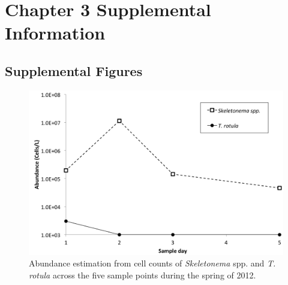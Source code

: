 


\chapter{Chapter 3 Supplemental Information}
\clearpage
\section{Supplemental Figures}

\begin{figure}[h!]
  \centering
    \includegraphics[width=1\textwidth]{Images/C3_SFigure1_CellCounts.png}
    \caption[Cell counts in Narragansett Bay during the spring of 2012]{Abundance estimation from cell counts of \textit{Skeletonema} spp. and \textit{T. rotula} across the five sample points during the spring of 2012. }
  \label{fig:a3f1}
\end{figure}


